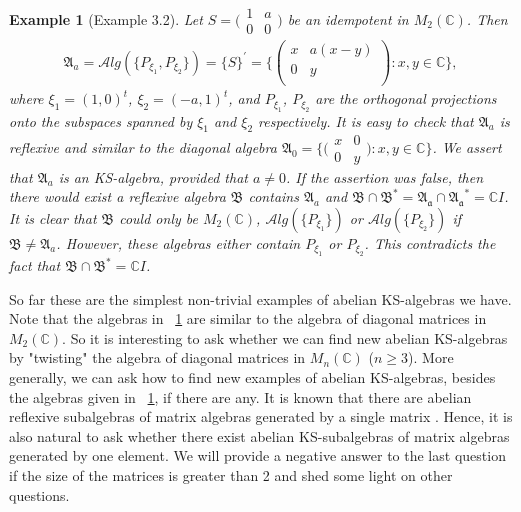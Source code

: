 \documentclass[a4paper,10pt]{amsart}
\newtheorem{example}{Example}[section]
\theoremstyle{refs}
\newcommand{\AAA}{\mathfrak A}
\newcommand{\PPP}[1]{ P_{#1}} %
\newcommand{\Alg}{\mathcal Alg}
\newcommand{\C}{\mathbb C} %
\begin{document}
\begin{example}[Example 3.2\cite{LW}] \label{example1}
Let $S = \bigl(\begin{smallmatrix}
           1 & a \\
           0 & 0
           \end{smallmatrix} \bigr)$
be an idempotent in $M_2(\C)$. Then
\begin{align*}
    \AAA_{a} = \Alg(\{ \PPP{\xi_1}, \PPP{\xi_2} \}) = \{S\}^{'}
= \{\left( \begin{matrix}
      x  & a(x-y) \\
      0 & y \\
   \end{matrix}
   \right): x, y \in \C \},
\end{align*}
where $\xi_{1} = (1, 0)^{t}$, $\xi_{2} = (-a, 1)^{t}$, and $\PPP{\xi_{1}}$,
$\PPP{\xi_2}$
are the orthogonal projections onto the subspaces spanned by $\xi_{1}$ and
$\xi_2$ respectively. It is easy to check that $\AAA_{a}$ is reflexive and
similar to the diagonal algebra
$\AAA_{0}=   \{ \bigl(\begin{smallmatrix}
           x & 0 \\
           0 & y
           \end{smallmatrix} \bigr)
 : x, y \in \C \} $. We assert that $\AAA_{a}$ is an
 KS-algebra, provided that $a \neq 0$. If the assertion was false,
 then there
 would exist a reflexive algebra $\mathfrak{B}$
 contains $\AAA_a$ and $\mathfrak{B} \cap
\mathfrak{B}^{*}=\mathfrak{A_a}\cap\mathfrak{A_a}^* = \C I$.
It is clear that $\mathfrak{B}$ could only be
$M_2(\C)$, $\Alg(\{\PPP{\xi_1}\})$ or $\Alg(\{\PPP{\xi_2}\})$ if
$\mathfrak{B} \neq \AAA_{a}$. However, these algebras either contain
$\PPP{\xi_1}$ or $\PPP{\xi_2}$. This contradicts the fact that
$\mathfrak{B} \cap \mathfrak{B}^{*}=\C I$.
\end{example}

So far these are the simplest non-trivial examples of abelian KS-algebras we
have. Note that the algebras in ~\cref{example1} are similar to the algebra of
diagonal matrices in $M_2(\C)$. So it is interesting to ask whether
we can
find new abelian KS-algebras by "twisting" the algebra of
diagonal matrices in $M_n(\C)$ ($n \geq 3$). More generally, we can
ask
how to find new examples of abelian KS-algebras, besides the algebras
given in ~\cref{example1}, if there are any.
It is known that there are abelian reflexive subalgebras of
matrix algebras generated by a single matrix \cite{Ded-Fil}.
Hence, it is
also natural to ask whether there exist abelian KS-subalgebras
of matrix algebras
generated by one element. We will provide a negative answer
to the last question if the size of the matrices is greater than 2 and shed some light on other questions.
\end{document}
